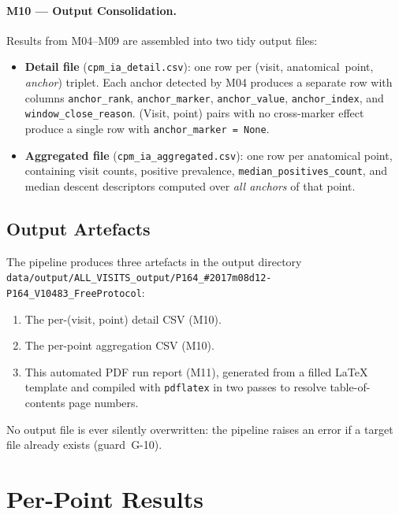 \documentclass[a4paper,11pt]{article}
\begin{document}
\paragraph{M10 --- Output Consolidation.}
Results from M04--M09 are assembled into two tidy output files:
\begin{itemize}
  \item \textbf{Detail file} (\texttt{cpm\_ia\_detail.csv}): one row per
        (visit, anatomical~point, \emph{anchor}) triplet. Each anchor detected by M04
        produces a separate row with columns \texttt{anchor\_rank},
        \texttt{anchor\_marker}, \texttt{anchor\_value}, \texttt{anchor\_index},
        and \texttt{window\_close\_reason}.
        (Visit, point) pairs with no cross-marker effect produce a single row with
        \texttt{anchor\_marker = None}.
  \item \textbf{Aggregated file} (\texttt{cpm\_ia\_aggregated.csv}): one row per
        anatomical point, containing visit counts, positive prevalence,
        \texttt{median\_positives\_count}, and median descent descriptors computed over
        \emph{all anchors} of that point.
\end{itemize}

\subsection{Output Artefacts}

The pipeline produces three artefacts in the output directory \texttt{data/output/ALL\_VISITS\_output/P164\_\#2017m08d12-P164\_V10483\_FreeProtocol}:
\begin{enumerate}
  \item The per-(visit, point) detail CSV (M10).
  \item The per-point aggregation CSV (M10).
  \item This automated PDF run report (M11), generated from a filled \LaTeX{} template
        and compiled with \texttt{pdflatex} in two passes to resolve table-of-contents
        page numbers.
\end{enumerate}
No output file is ever silently overwritten: the pipeline raises an error if a target
file already exists (guard~G-10).

\section{Per-Point Results}
\end{document}
